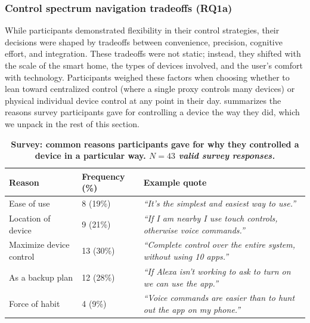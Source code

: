 \subsubsection{Control spectrum navigation tradeoffs (RQ1a)}
\label{cic:subsec:tradeoffs}
While participants demonstrated flexibility in their control strategies, their decisions were shaped by tradeoffs between convenience, precision, cognitive effort, and integration. These tradeoffs were not static; instead, they shifted with the scale of the smart home, the types of devices involved, and the user's comfort with technology. Participants weighed these factors when choosing whether to lean toward centralized control (where a single proxy controls many devices) or physical individual device control at any point in their day.  summarizes the reasons survey participants gave for controlling a device the way they did, which we unpack in the rest of this section.

\begin{table}[t]
    \centering
    \caption{\bf \small Survey: common reasons participants gave for why they controlled a device in a particular way. {\it $N=43$ valid survey responses.}}
    \bigskip
    \label{cic:tab:control-reasons}
    \small
    \renewcommand{\arraystretch}{1.2}
    \begin{tabular}{m{4cm} m{3cm} m{8cm}}
        \hline
        \textbf{Reason} & \textbf{Frequency (\%)} & \textbf{Example quote} \\
        \hline\hline
        Ease of use & 8 (19\%) & \textit{``It's the simplest and easiest way to use.''} \\ \hline
        Location of device & 9 (21\%) & \textit{``If I am nearby I use touch controls, otherwise voice commands.''} \\ \hline
        Maximize device control & 13 (30\%) & \textit{``Complete control over the entire system, without using 10 apps.''} \\ \hline
        As a backup plan & 12 (28\%) & \textit{``If Alexa isn't working to ask to turn on we can use the app.''} \\ \hline
        Force of habit & 4 (9\%) & \textit{``Voice commands are easier than to hunt out the app on my phone.''} \\ \hline
        \hline
    \end{tabular}
    \medskip
\end{table}

